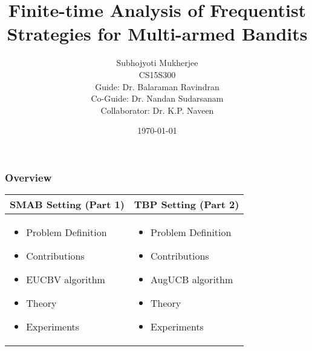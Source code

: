 \documentclass{beamer}
\title[Finite-time Analysis of Frequentist Strategies for Multi-armed Bandits]{Finite-time Analysis of Frequentist Strategies for Multi-armed Bandits} %
\author{Subhojyoti Mukherjee \\ CS15S300 \\ Guide: Dr. Balaraman Ravindran \\ Co-Guide: Dr. Nandan Sudarsanam \\  Collaborator: Dr. K.P. Naveen} %
\institute[IIT Madras] %
{
IIT Madras \\ %
\medskip
}
\date{\today} %
\begin{document}
\nocite{*}
\begin{frame}
\titlepage %
\end{frame}

\begin{frame}
\frametitle{Overview} %
\centering
    \begin{tabular}{|p{5cm}|p{5cm}|}
    \hline
SMAB Setting (Part 1) & TBP Setting (Part 2) \\
\hline
    \begin{itemize}
    \item Problem Definition
    \item Contributions
    \item EUCBV algorithm
    \item Theory
    \item Experiments
    \end{itemize}
    &
    \begin{itemize}
    \item Problem Definition
    \item Contributions
    \item AugUCB algorithm
    \item Theory
    \item Experiments
    \end{itemize}
\\\hline
    \end{tabular}
\end{frame}



%
\end{document}
